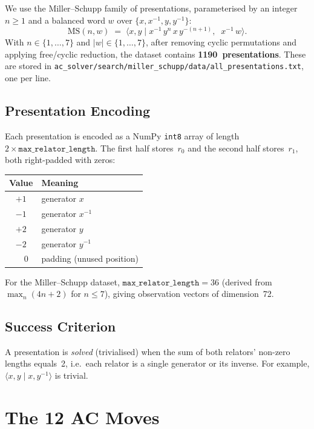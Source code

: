\documentclass[11pt,a4paper]{article}
\newcommand{\pres}[2]{\langle #1 \mid #2 \rangle}
\newcommand{\inv}[1]{#1^{-1}}
\begin{document}
We use the Miller--Schupp family of presentations, parameterised by an integer
$n \ge 1$ and a balanced word $w$ over $\{x, \inv{x}, y, \inv{y}\}$:
\[
  \mathrm{MS}(n, w) \;=\; \pres{x, y}{\inv{x}\, y^n\, x\, y^{-(n+1)},\;\; \inv{x}\, w}.
\]
With $n \in \{1, \ldots, 7\}$ and $|w| \in \{1, \ldots, 7\}$, after removing
cyclic permutations and applying free/cyclic reduction, the dataset contains
\textbf{1190~presentations}.  These are stored in
\texttt{ac\_solver/search/miller\_schupp/data/all\_presentations.txt}, one
per line.

\subsection{Presentation Encoding}

Each presentation is encoded as a NumPy \texttt{int8} array of length
$2 \times \texttt{max\_relator\_length}$.  The first half stores~$r_0$ and the
second half stores~$r_1$, both right-padded with zeros:
\begin{center}
\begin{tabular}{cl}
  \toprule
  \textbf{Value} & \textbf{Meaning} \\
  \midrule
  $+1$ & generator $x$ \\
  $-1$ & generator $\inv{x}$ \\
  $+2$ & generator $y$ \\
  $-2$ & generator $\inv{y}$ \\
  $\phantom{+}0$ & padding (unused position) \\
  \bottomrule
\end{tabular}
\end{center}
For the Miller--Schupp dataset, $\texttt{max\_relator\_length} = 36$
(derived from $\max_n(4n+2)$ for $n \le 7$), giving observation vectors of
dimension~72.

\subsection{Success Criterion}

A presentation is \emph{solved} (trivialised) when the sum of both relators'
non-zero lengths equals~2, i.e.\ each relator is a single generator or its
inverse.  For example, $\pres{x,y}{x, \inv{y}}$ is trivial.

\section{The 12 AC Moves}\label{sec:moves}
\end{document}
